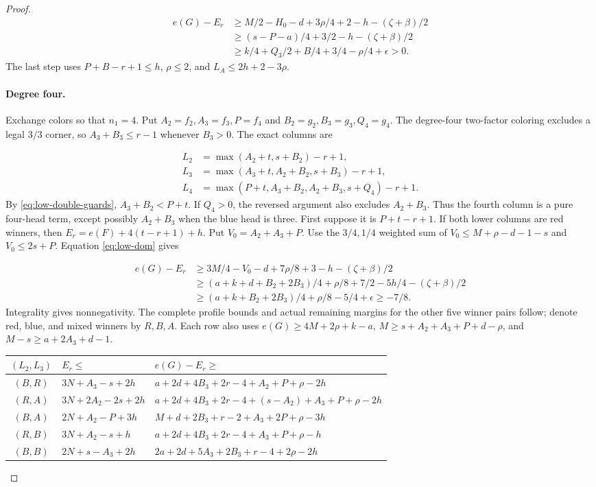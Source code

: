 \documentclass[11pt,a4paper]{article}
\theoremstyle{definition}
\begin{document}
\begin{proof}
\[
\begin{aligned}
e(G)-E_r
&\ge M/2-H_0-d+3\rho/4+2-h-(\zeta+\beta)/2\\
&\ge(s-P-a)/4+3/2-h-(\zeta+\beta)/2\\
&\ge k/4+Q_3/2+B/4+3/4-\rho/4+\epsilon>0.
\end{aligned}
\]
The last step uses $P+B-r+1\le h$, $\rho\le2$, and
$L_A\le2h+2-3\rho$.

\paragraph{Degree four.}
Exchange colors so that $n_1=4$.
Put $A_2=f_2,A_3=f_3,P=f_4$ and $B_2=g_2,B_3=g_3,Q_4=g_4$.
The degree-four two-factor coloring excludes a legal $3/3$ corner, so
$A_3+B_3\le r-1$ whenever $B_3>0$.
The exact columns are

\[
\begin{aligned}
L_2&=\max(A_2+t,s+B_2)-r+1,\\
L_3&=\max(A_3+t,A_2+B_2,s+B_3)-r+1,\\
L_4&=\max(P+t,A_3+B_2,A_2+B_3,s+Q_4)-r+1.
\end{aligned}
\]
By \eqref{eq:low-double-guards}, $A_3+B_2<P+t$.
If $Q_4>0$, the reversed argument also excludes $A_2+B_3$.
Thus the fourth column is a pure four-head term, except possibly $A_2+B_3$ when the blue head is three.
First suppose it is $P+t-r+1$.
If both lower columns are red winners, then $E_r=e(F)+4(t-r+1)+h$.
Put $V_0=A_2+A_3+P$.
Use the $3/4,1/4$ weighted sum of
$V_0\le M+\rho-d-1-s$ and $V_0\le2s+P$.
Equation \eqref{eq:low-dom} gives

\[
\begin{aligned}
e(G)-E_r
&\ge3M/4-V_0-d+7\rho/8+3-h-(\zeta+\beta)/2\\
&\ge(a+k+d+B_2+2B_3)/4+\rho/8+7/2-5h/4-(\zeta+\beta)/2\\
&\ge(a+k+B_2+2B_3)/4+\rho/8-5/4+\epsilon\ge-7/8.
\end{aligned}
\]
Integrality gives nonnegativity.
The complete profile bounds and actual remaining margins for the other five winner pairs follow; denote red, blue, and mixed winners by $R,B,A$.
Each row also uses
$e(G)\ge4M+2\rho+k-a$,
$M\ge s+A_2+A_3+P+d-\rho$, and
$M-s\ge a+2A_3+d-1$.

\begin{center}\small
\begin{longtable}{cP{.35\textwidth}P{.48\textwidth}}
\toprule
$(L_2,L_3)$&$E_r\le$&$e(G)-E_r\ge$\\\midrule
$(B,R)$&$3N+A_3-s+2h$&
$a+2d+4B_3+2r-4+A_2+P+\rho-2h$\\
$(R,A)$&$3N+2A_2-2s+2h$&
$a+2d+4B_3+2r-4+(s-A_2)+A_3+P+\rho-2h$\\
$(B,A)$&$2N+A_2-P+3h$&
$M+d+2B_3+r-2+A_3+2P+\rho-3h$\\
$(R,B)$&$3N+A_2-s+h$&
$a+2d+4B_3+2r-4+A_3+P+\rho-h$\\
$(B,B)$&$2N+s-A_3+2h$&
$2a+2d+5A_3+2B_3+r-4+2\rho-2h$\\
\bottomrule
\end{longtable}\end{center}


\end{proof}
\end{document}
